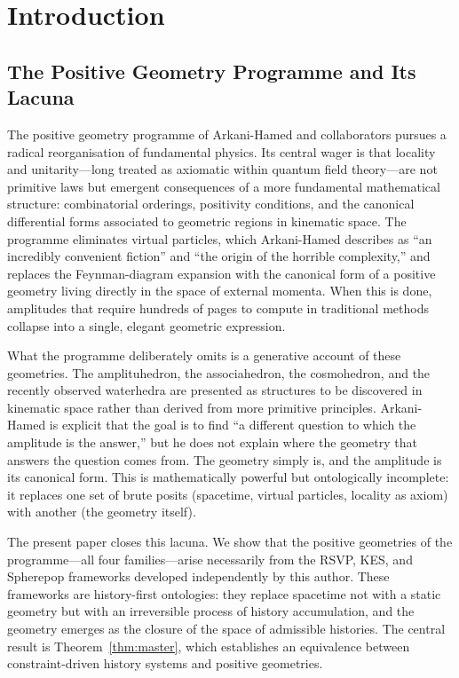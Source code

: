 \documentclass[12pt, oneside]{amsart}
\theoremstyle{plain}
\theoremstyle{definition}
\theoremstyle{remark}
\begin{document}
\tableofcontents
\newpage

\section{Introduction}
\label{sec:intro}

\subsection{The Positive Geometry Programme and Its Lacuna}

The positive geometry programme of Arkani-Hamed and collaborators pursues a radical reorganisation of fundamental physics. Its central wager is that locality and unitarity---long treated as axiomatic within quantum field theory---are not primitive laws but emergent consequences of a more fundamental mathematical structure: combinatorial orderings, positivity conditions, and the canonical differential forms associated to geometric regions in kinematic space. The programme eliminates virtual particles, which Arkani-Hamed describes as ``an incredibly convenient fiction'' and ``the origin of the horrible complexity,'' and replaces the Feynman-diagram expansion with the canonical form of a positive geometry living directly in the space of external momenta. When this is done, amplitudes that require hundreds of pages to compute in traditional methods collapse into a single, elegant geometric expression.

What the programme deliberately omits is a generative account of these geometries. The amplituhedron, the associahedron, the cosmohedron, and the recently observed waterhedra are presented as structures to be discovered in kinematic space rather than derived from more primitive principles. Arkani-Hamed is explicit that the goal is to find ``a different question to which the amplitude is the answer,'' but he does not explain where the geometry that answers the question comes from. The geometry simply is, and the amplitude is its canonical form. This is mathematically powerful but ontologically incomplete: it replaces one set of brute posits (spacetime, virtual particles, locality as axiom) with another (the geometry itself).

The present paper closes this lacuna. We show that the positive geometries of the programme---all four families---arise necessarily from the RSVP, KES, and Spherepop frameworks developed independently by this author. These frameworks are history-first ontologies: they replace spacetime not with a static geometry but with an irreversible process of history accumulation, and the geometry emerges as the closure of the space of admissible histories. The central result is Theorem~\ref{thm:master}, which establishes an equivalence between constraint-driven history systems and positive geometries.
\end{document}
